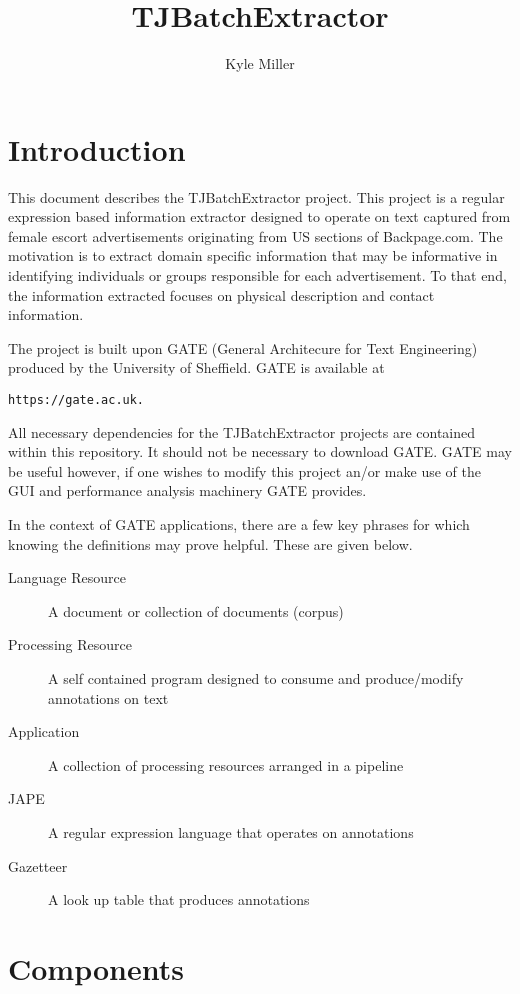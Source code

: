 \documentclass{article}
\begin{document}
\title{{TJBatchExtractor}}
\author{Kyle Miller}

\maketitle

\section{Introduction}
This document describes the {TJBatchExtractor} project. This project is
a regular expression based information extractor designed to operate on
text captured from female escort advertisements originating from {US}
sections of {B}ackpage.com. The motivation is to extract domain specific
information that may be informative in identifying individuals or groups
responsible for each advertisement. To that end, the information extracted
focuses on physical description and contact information.

The project is built upon {GATE} ({G}eneral {A}rchitecure for {T}ext
{E}ngineering) produced by the {U}niversity of {S}heffield. {GATE} is
available at 
\begin{lstlisting}[style=Bash]
https://gate.ac.uk.
\end{lstlisting}
All necessary dependencies for the 
{TJBatchExtractor} projects are contained within this repository. It should
not be necessary to download {GATE}. {GATE} may be useful however, if one
wishes to modify this project an/or make use of the {GUI} and performance
analysis machinery {GATE} provides.

In the context of {GATE} applications, there are a few key phrases for which
knowing the definitions may prove helpful. These are given below.

\begin{description}
\item[Language Resource] A document or collection of documents (corpus)
\item[Processing Resource] A self contained program designed to consume and produce/modify annotations on text
\item[Application] A collection of processing resources arranged in a pipeline
\item[JAPE] A regular expression language that operates on annotations
\item[Gazetteer] A look up table that produces annotations
\end{description}

\section{Components}
\end{document}
